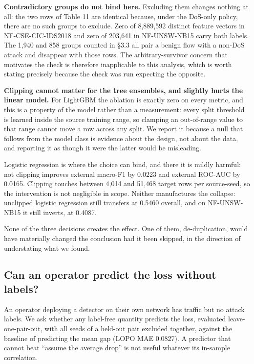 \documentclass[preprint,12pt,nopreprintline]{elsarticle}
\begin{document}
\textbf{Contradictory groups do not bind here.} Excluding them changes nothing at all: the two rows of Table 11 are identical because, under the DoS-only policy, there are no such groups to exclude. Zero of 8,889,592 distinct feature vectors in NF-CSE-CIC-IDS2018 and zero of 203,641 in NF-UNSW-NB15 carry both labels. The 1,940 and 858 groups counted in \S{}3.3 all pair a benign flow with a non-DoS attack and disappear with those rows. The arbitrary-survivor concern that motivates the check is therefore inapplicable to this analysis, which is worth stating precisely because the check was run expecting the opposite.

\textbf{Clipping cannot matter for the tree ensembles, and slightly hurts the linear model.} For LightGBM the ablation is exactly zero on every metric, and this is a property of the model rather than a measurement: every split threshold is learned inside the source training range, so clamping an out-of-range value to that range cannot move a row across any split. We report it because a null that follows from the model class is evidence about the design, not about the data, and reporting it as though it were the latter would be misleading.

Logistic regression is where the choice can bind, and there it is mildly harmful: not clipping improves external macro-F1 by 0.0223 and external ROC-AUC by 0.0165. Clipping touches between 4,014 and 51,468 target rows per source-seed, so the intervention is not negligible in scope. Neither manufactures the collapse: unclipped logistic regression still transfers at 0.5460 overall, and on NF-UNSW-NB15 it still inverts, at 0.4087.

None of the three decisions creates the effect. One of them, de-duplication, would have materially changed the conclusion had it been skipped, in the direction of understating what we found.

\subsection{Can an operator predict the loss without labels?}

An operator deploying a detector on their own network has traffic but no attack labels. We ask whether any label-free quantity predicts the loss, evaluated leave-one-pair-out, with all seeds of a held-out pair excluded together, against the baseline of predicting the mean gap (LOPO MAE 0.0827). A predictor that cannot beat ``assume the average drop'' is not useful whatever its in-sample correlation.
\end{document}
